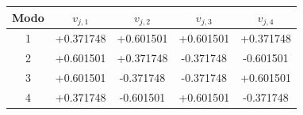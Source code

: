 \begin{tabular}{c cccc}
\toprule
 Modo & $v_{j,1}$ & $v_{j,2}$ & $v_{j,3}$ & $v_{j,4}$\\
\midrule
1 & +0.371748 & +0.601501 & +0.601501 & +0.371748\\
2 & +0.601501 & +0.371748 & -0.371748 & -0.601501\\
3 & +0.601501 & -0.371748 & -0.371748 & +0.601501\\
4 & +0.371748 & -0.601501 & +0.601501 & -0.371748\\
\bottomrule
\end{tabular}
